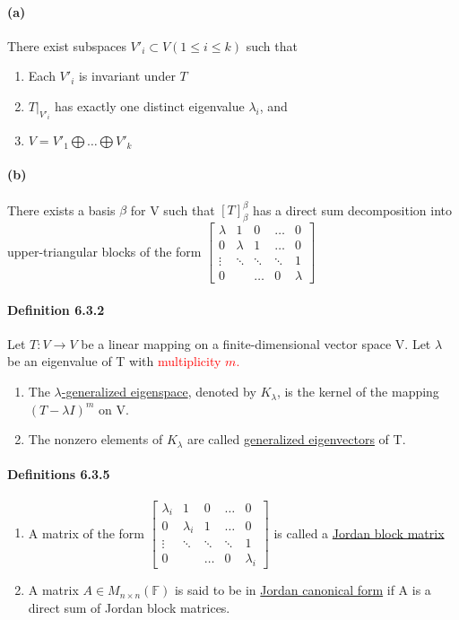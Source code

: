 \documentclass[11pt]{article}
\newcommand{\mb}[1]{\mathbb{#1}}
\newcommand{\under}[1]{\underline{#1}}
\begin{document}
{\paragraph{(a)}There exist subspaces $V'_i\subset V (1\leq i \leq k)$ such that
\begin{enumerate}
	\item Each $V'_i$ is invariant under $T$
	\item $T|_{V'_i}$ has exactly one distinct eigenvalue $\lambda_i$, and
	\item $V = V'_1 \bigoplus \hdots \bigoplus V'_k$
\end{enumerate}
\paragraph{(b)} There exists a basis $\beta$ for V such that $[T]_\beta^\beta$ has a direct sum decomposition into upper-triangular blocks of the form 	$\begin{bmatrix}
		\lambda &1&0&\hdots&0\\
		0&\lambda&1&\hdots&0\\
		\vdots & \ddots&\ddots&\ddots&1\\
		0&&\hdots&0&\lambda
	\end{bmatrix}$
\paragraph{Definition 6.3.2} Let $T: V \rightarrow V$ be a linear mapping on a finite-dimensional vector space V. Let $\lambda$ be an eigenvalue of T with \textcolor{red}{multiplicity $m$.}
\begin{enumerate}
	\item The \under{$\lambda$-generalized eigenspace}, denoted by $K_\lambda$, is the kernel of the mapping $(T - \lambda I)^m$ on V.
	\item The nonzero elements of $K_\lambda$ are called \under{generalized eigenvectors} of T.
\end{enumerate}

\paragraph{Definitions 6.3.5}
\begin{enumerate}
	\item A matrix of the form
	$\begin{bmatrix}
		\lambda_i &1&0&\hdots&0\\
		0&\lambda_i&1&\hdots&0\\
		\vdots & \ddots&\ddots&\ddots&1\\
		0&&\hdots&0&\lambda_i
	\end{bmatrix}$ is called a \under{Jordan block matrix}
	\item A matrix $A \in M_{n \times n}(\mb{F})$ is said to be in \under{Jordan canonical form} if A is a direct sum of Jordan block matrices.
\end{enumerate}
}
\end{document}
